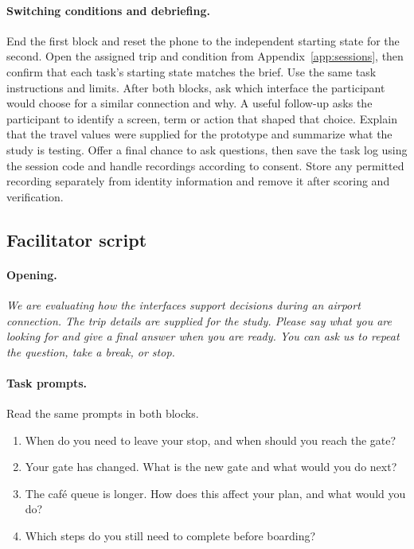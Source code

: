 \documentclass[sigconf,nonacm,balance=false]{acmart}
\begin{document}
\paragraph{Switching conditions and debriefing.} End the first block and reset the phone to the independent starting state for the second. Open the assigned trip and condition from Appendix~\ref{app:sessions}, then confirm that each task's starting state matches the brief. Use the same task instructions and limits. After both blocks, ask which interface the participant would choose for a similar connection and why. A useful follow-up asks the participant to identify a screen, term or action that shaped that choice. Explain that the travel values were supplied for the prototype and summarize what the study is testing. Offer a final chance to ask questions, then save the task log using the session code and handle recordings according to consent. Store any permitted recording separately from identity information and remove it after scoring and verification.

\subsection{Facilitator script}
\paragraph{Opening.} \emph{We are evaluating how the interfaces support decisions during an airport connection. The trip details are supplied for the study. Please say what you are looking for and give a final answer when you are ready. You can ask us to repeat the question, take a break, or stop.}

\paragraph{Task prompts.} Read the same prompts in both blocks.
\begin{enumerate}
\item When do you need to leave your stop, and when should you reach the gate?
\item Your gate has changed. What is the new gate and what would you do next?
\item The caf\'e queue is longer. How does this affect your plan, and what would you do?
\item Which steps do you still need to complete before boarding?
\end{enumerate}
\end{document}

